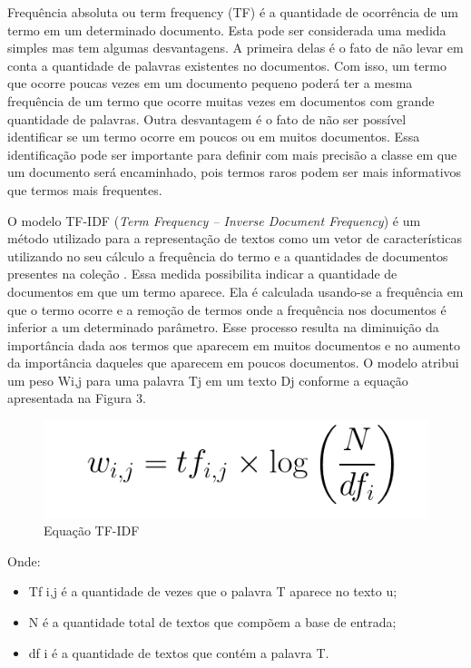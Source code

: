\documentclass[conference]{IEEEtran}
\begin{document}
    Frequência absoluta ou term frequency (TF) \cite{tfidf} é a quantidade de ocorrência de um termo em um determinado documento. Esta pode ser considerada uma medida simples mas tem algumas desvantagens. A primeira delas é o fato de não levar em conta a quantidade de palavras existentes no documentos. Com isso, um termo que ocorre poucas vezes em um documento pequeno poderá ter a mesma frequência de um termo que ocorre muitas vezes em documentos com grande quantidade de palavras. Outra desvantagem é o fato de não ser possível identificar se um termo ocorre em poucos ou em muitos documentos. Essa identificação pode ser importante para definir com mais precisão a classe em que um documento será encaminhado, pois termos raros podem ser mais informativos que termos mais frequentes.
    
    O modelo TF-IDF (\textit{Term Frequency – Inverse Document Frequency}) \cite{tfidf3} é um método utilizado para a representação de textos como um vetor de características utilizando no seu cálculo a frequência do
    termo e a quantidades de documentos presentes na coleção \cite{tfidf1} \cite{tfidf2}. Essa medida possibilita
    indicar a quantidade de documentos em que um termo aparece. Ela é calculada usando-se a frequência em que o termo ocorre e a remoção de termos onde a frequência nos documentos é inferior a um determinado parâmetro. Esse processo resulta na diminuição da importância dada aos termos que aparecem em muitos documentos e no aumento da
    importância daqueles que aparecem em poucos documentos. O modelo atribui um peso Wi,j para uma palavra Tj em um texto Dj conforme a equação apresentada na Figura 3.


	\begin{figure}[htbp]
	\centerline{\includegraphics[scale=.5]{imagens/tfidf.png}}
	\caption{Equação TF-IDF}
	\label{fig}
	\end{figure}
     Onde:
\begin{itemize}
\item  Tf i,j é a quantidade de vezes que o palavra T aparece no texto u;
\item  N é a quantidade total de textos que compõem a base de entrada;
\item  df i é a quantidade de textos que contém a palavra T.
\end{itemize}
    
\end{document}
